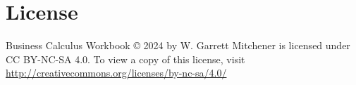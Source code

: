 \section*{License}

Business Calculus Workbook \copyright{} 2024 by W. Garrett Mitchener is licensed under CC BY-NC-SA 4.0. To view a copy of this license, visit \url{http://creativecommons.org/licenses/by-nc-sa/4.0/}

